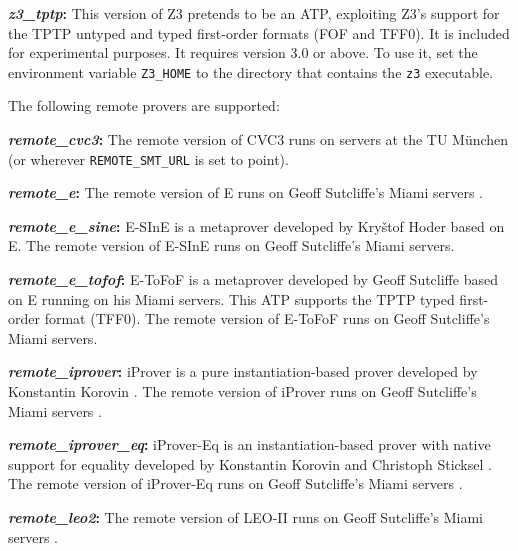 \documentclass[a4paper,12pt]{article}
\begin{document}
\begin{enum}
\begin{enum}
\item[\labelitemi] \textbf{\textit{z3\_tptp}:} This version of Z3 pretends to be
an ATP, exploiting Z3's support for the TPTP untyped and typed first-order
formats (FOF and TFF0). It is included for experimental purposes. It
requires version 3.0 or above. To use it, set the environment variable
\texttt{Z3\_HOME} to the directory that contains the \texttt{z3}
executable.
\end{enum}

The following remote provers are supported:

\begin{enum}
\item[\labelitemi] \textbf{\textit{remote\_cvc3}:} The remote version of CVC3 runs
on servers at the TU M\"unchen (or wherever \texttt{REMOTE\_SMT\_URL} is set to
point).

\item[\labelitemi] \textbf{\textit{remote\_e}:} The remote version of E runs
on Geoff Sutcliffe's Miami servers \cite{sutcliffe-2000}.

\item[\labelitemi] \textbf{\textit{remote\_e\_sine}:} E-SInE is a metaprover
developed by Kry\v stof Hoder \cite{sine} based on E. The remote version of
E-SInE runs on Geoff Sutcliffe's Miami servers.

\item[\labelitemi] \textbf{\textit{remote\_e\_tofof}:} E-ToFoF is a metaprover
developed by Geoff Sutcliffe \cite{tofof} based on E running on his Miami
servers. This ATP supports the TPTP typed first-order format (TFF0). The
remote version of E-ToFoF runs on Geoff Sutcliffe's Miami servers.

\item[\labelitemi] \textbf{\textit{remote\_iprover}:} iProver is a pure
instantiation-based prover developed by Konstantin Korovin \cite{korovin-2009}. The
remote version of iProver runs on Geoff Sutcliffe's Miami servers
\cite{sutcliffe-2000}.

\item[\labelitemi] \textbf{\textit{remote\_iprover\_eq}:} iProver-Eq is an
instantiation-based prover with native support for equality developed by
Konstantin Korovin and Christoph Sticksel \cite{korovin-sticksel-2010}. The
remote version of iProver-Eq runs on Geoff Sutcliffe's Miami servers
\cite{sutcliffe-2000}.

\item[\labelitemi] \textbf{\textit{remote\_leo2}:} The remote version of LEO-II
runs on Geoff Sutcliffe's Miami servers \cite{sutcliffe-2000}.


\end{enum}
\end{enum}
\end{document}
